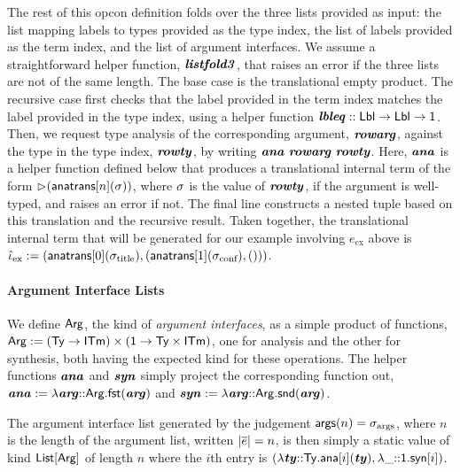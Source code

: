 \documentclass[10pt,preprint]{sigplanconf}
\begin{document}
The rest of this opcon definition folds over the three lists provided as input: the list mapping labels to types provided as the type index, the list of labels provided as the term index, and the list of argument interfaces. We assume a straightforward helper function, ${\textbf{\textit{listfold3}}}$, that raises an error if the three lists are not of the same length. The base case is the translational empty product. The recursive case first checks that the label provided in the term index matches the label provided in the type index, using a helper function ${\textbf{\textit{lbleq}}} :: {\sf Lbl} \rightarrow {\sf Lbl} \rightarrow {\sf 1}$. Then, we request type analysis of the corresponding argument, ${\textbf{\textit{rowarg}}}$,  against the type in the type index, ${\textbf{\textit{rowty}}}$, by writing ${\textbf{\textit{ana}}}~{\textbf{\textit{rowarg}}}~{\textbf{\textit{rowty}}}$. Here, ${\textbf{\textit{ana}}}$ is a helper function defined below that produces a translational internal term  of the form ${\rhd}({\sf anatrans}[n](\sigma))$, where $\sigma$ is the value of ${\textbf{\textit{rowty}}}$, if the argument is well-typed, and raises an error if not. The final line constructs a nested tuple based on this translation and the recursive result. Taken together, the translational internal term that will be generated for our example involving $e_\text{ex}$ above is $\small\qitm_\text{ex} := (\anatrans{0}{\stx{title}}, (\anatrans{1}{\stx{conf}}, ()))$.

\paragraph{Argument Interface Lists} We define ${\sf Arg}$, the kind of \emph{argument interfaces}, as a simple product of functions, ${\sf Arg} := ({\sf Ty} \rightarrow {\sf ITm}) \times ({\sf 1} \rightarrow {\sf Ty}\times{\sf ITm})$, one for analysis and the other for synthesis, both having the expected kind for these operations. The helper functions ${\textbf{\textit{ana}}}$ and ${\textbf{\textit{syn}}}$ simply project the corresponding function out, ${\textbf{\textit{ana}}} := \lambda {\textbf{\textit{arg}}}{::}{\sf Arg}.{\sf fst}({\textbf{\textit{arg}}})$ and ${\textbf{\textit{syn}}}  :=  \lambda {\textbf{\textit{arg}}}{::}{\sf Arg}.{\sf snd}({\textbf{\textit{arg}}})$. 

The argument interface list generated by the judgement ${\sf args}(n)=\sigma_\text{args}$, where $n$ is the length of the argument list, written $|\overline{e}|=n$, is then simply a static value of kind ${\sf List}[{\sf Arg}]$ of length $n$ where the $i$th entry is $(\lambda {\textbf{\textit{ty}}}{::}{\sf Ty}.{\sf ana}[i]({\textbf{\textit{ty}}}), \lambda \_{::}{\sf 1}.{\sf syn}[i])$.



\end{document}
